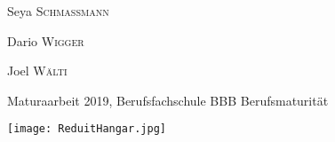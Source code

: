 \begin{titlepage}
            Seya \textsc{Schmassmann} %

            Dario \textsc{Wigger} %
            
			Joel \textsc{Wälti} %
	
	\vfill\vfill\vfill %
	
	{\large Maturaarbeit 2019, Berufsfachschule BBB Berufsmaturität} %
	
	
	\vfill\vfill
	\texttt{[image: ReduitHangar.jpg]}\\[1cm] %
	 
	
	\vfill %
	
\end{titlepage}